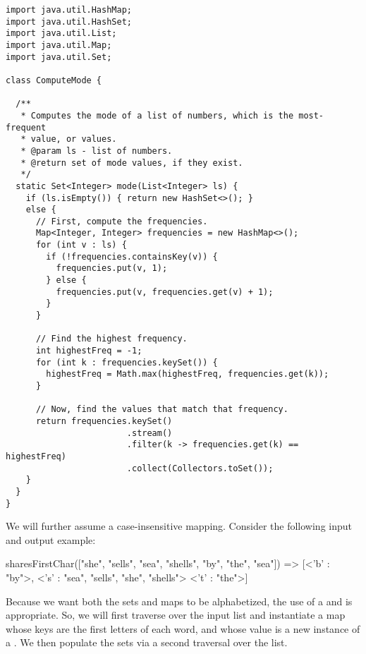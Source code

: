 \begin{lstlisting}[language=MyJava]
import java.util.HashMap;
import java.util.HashSet;
import java.util.List;
import java.util.Map;
import java.util.Set;

class ComputeMode {

  /**
   * Computes the mode of a list of numbers, which is the most-frequent
   * value, or values.
   * @param ls - list of numbers.
   * @return set of mode values, if they exist.
   */
  static Set<Integer> mode(List<Integer> ls) {
    if (ls.isEmpty()) { return new HashSet<>(); } 
    else {
      // First, compute the frequencies.
      Map<Integer, Integer> frequencies = new HashMap<>();
      for (int v : ls) {
        if (!frequencies.containsKey(v)) {
          frequencies.put(v, 1);
        } else {
          frequencies.put(v, frequencies.get(v) + 1);
        }
      } 

      // Find the highest frequency.
      int highestFreq = -1;
      for (int k : frequencies.keySet()) {
        highestFreq = Math.max(highestFreq, frequencies.get(k));
      }

      // Now, find the values that match that frequency.
      return frequencies.keySet()
                        .stream()
                        .filter(k -> frequencies.get(k) == highestFreq)
                        .collect(Collectors.toSet());
    }
  }
}
\end{lstlisting}

We will further assume a case-insensitive mapping. 
Consider the following input and output example:

\begin{verbnobox}[\small]
sharesFirstChar(["she", "sells", "sea", "shells", "by", "the", "sea"])
  => [<'b' : {"by"}>, 
      <'s' : {"sea", "sells", "she", "shells"}>
      <'t' : {"the"}>]
\end{verbnobox}

Because we want both the sets and maps to be alphabetized, the use of a  and  is appropriate. 
So, we will first traverse over the input list and instantiate a map whose keys are the first letters of each word, and whose value is a new instance of a . 
We then populate the sets via a second traversal over the list.


